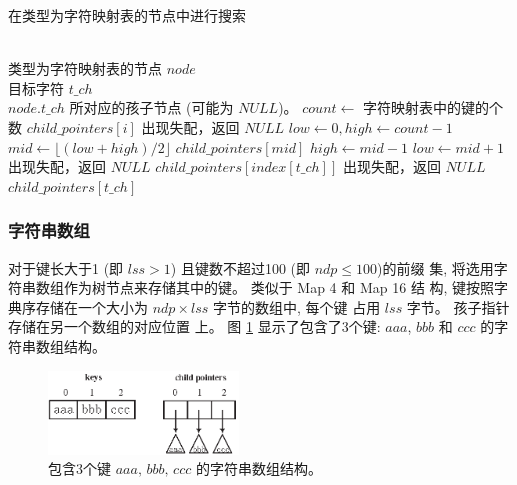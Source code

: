 \begin{algorithm}
  \caption{在类型为字符映射表的节点中进行搜索}
  \label{alg:character map}
  \begin{algorithmic}[1]
    \REQUIRE ~~\\
    类型为字符映射表的节点 $node$\\
    目标字符 $t\_ch$
    \ENSURE ~~\\
     $node.t\_ch$ 所对应的孩子节点 (可能为 $NULL$)。
    \STATE
    \STATE $count \leftarrow$ 字符映射表中的键的个数
    \STATE
    \RETURN $child\_pointers[i]$
    \ENDIF
    \ENDFOR
    \STATE 出现失配，返回 $NULL$
    \ENDCASE
    \STATE
    \STATE $low \leftarrow 0, high \leftarrow count-1$
    \STATE $mid \leftarrow \lfloor (low+high)/2 \rfloor$
    \RETURN $child\_pointers[mid]$
    \STATE $high \leftarrow mid-1$
    \ELSE
    \STATE $low \leftarrow mid+1$
    \ENDIF
    \ENDWHILE
    \STATE 出现失配，返回 $NULL$
    \ENDCASE
    \STATE
    \RETURN $child\_pointers[index[t\_ch]]$
    \ELSE
    \STATE 出现失配，返回 $NULL$
    \ENDIF
    \ENDCASE
    \STATE
    \RETURN $child\_pointers[t\_ch]$
    \ENDCASE
    \ENDPWITCH
  \end{algorithmic}
\end{algorithm}

\subsubsection{字符串数组}
\label{sec:string array}

对于键长大于1 (即 $lss > 1$) 且键数不超过100 (即 $ndp \leq 100$)的前缀
集, 将选用字符串数组作为树节点来存储其中的键。 类似于 Map 4 和 Map 16 结
构, 键按照字典序存储在一个大小为 $ndp \times lss$ 字节的数组中, 每个键
占用 $lss$ 字节。 孩子指针存储在另一个数组的对应位置
上。 图 \ref{fig:string array} 显示了包含了3个键: $aaa$, $bbb$ 和 $ccc$
的字符串数组结构。

\begin{figure}[H]
  \centering
  \includegraphics[width=0.45\textwidth]{figures/2_MPM/string_array}
  \caption{包含3个键 $aaa,\, bbb,\, ccc$ 的字符串数组结构。}
  \label{fig:string array}
\end{figure}

